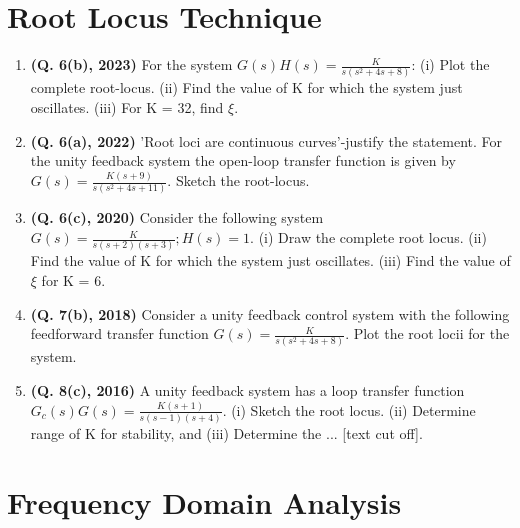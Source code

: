 \documentclass[12pt, a4paper]{article}
\begin{document}
	
	\section{Root Locus Technique}
	\begin{enumerate}
		\item \textbf{(Q. 6(b), 2023)} For the system $G(s)H(s) = \frac{K}{s(s^2+4s+8)}$: (i) Plot the complete root-locus. (ii) Find the value of K for which the system just oscillates. (iii) For K = 32, find $\xi$.
		\item \textbf{(Q. 6(a), 2022)} 'Root loci are continuous curves'-justify the statement. For the unity feedback system the open-loop transfer function is given by $G(s) = \frac{K(s+9)}{s(s^2+4s+11)}$. Sketch the root-locus.
		\item \textbf{(Q. 6(c), 2020)} Consider the following system $G(s) = \frac{K}{s(s+2)(s+3)}; H(s)=1$. (i) Draw the complete root locus. (ii) Find the value of K for which the system just oscillates. (iii) Find the value of $\xi$ for K = 6.
		\item \textbf{(Q. 7(b), 2018)} Consider a unity feedback control system with the following feedforward transfer function $G(s) = \frac{K}{s(s^2+4s+8)}$. Plot the root locii for the system.
		\item \textbf{(Q. 8(c), 2016)} A unity feedback system has a loop transfer function $G_c(s)G(s) = \frac{K(s+1)}{s(s-1)(s+4)}$. (i) Sketch the root locus. (ii) Determine range of K for stability, and (iii) Determine the ... [text cut off].
	\end{enumerate}
	
	\section{Frequency Domain Analysis}
\end{document}
